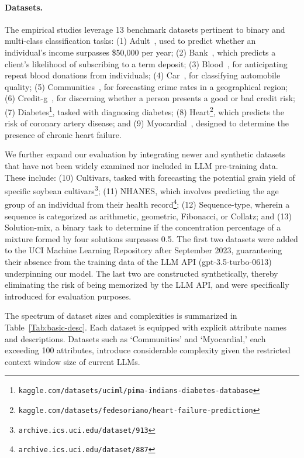 \paragraph{Datasets.}
The empirical studies leverage 13 benchmark datasets pertinent to binary and multi-class classification tasks: (1) Adult~\cite{asuncion2007uci}, used to predict whether an individual's income surpasses \$50,000 per year; (2) Bank~\cite{moro2014data}, which predicts a client’s likelihood of subscribing to a term deposit; (3) Blood~\cite{yeh2009knowledge}, for anticipating repeat blood donations from individuals; (4) Car~\cite{kadra2021well}, for classifying automobile quality; (5) Communities~\cite{misc_communities_and_crime_183}, for forecasting crime rates in a geographical region; (6) Credit-g~\cite{kadra2021well}, for discerning whether a person presents a good or bad credit risk; (7) Diabetes\footnote{\texttt{kaggle.com/datasets/uciml/pima-indians-diabetes-database}}, tasked with diagnosing diabetes; (8) Heart\footnote{\texttt{kaggle.com/datasets/fedesoriano/heart-failure-prediction}}, which predicts the risk of coronary artery disease; and (9) Myocardial~\cite{misc_myocardial_infarction_complications_579}, designed to determine the presence of chronic heart failure.

We further expand our evaluation by integrating newer and synthetic datasets that have not been widely examined nor included in LLM pre-training data. These include: (10) Cultivars, tasked with forecasting the potential grain yield of specific soybean cultivars\footnote{\texttt{archive.ics.uci.edu/dataset/913}}; (11) NHANES, which involves predicting the age group of an individual from their health record\footnote{\texttt{archive.ics.uci.edu/dataset/887}}; (12) Sequence-type, wherein a sequence is categorized as arithmetic, geometric, Fibonacci, or Collatz; and (13) Solution-mix, a binary task to determine if the concentration percentage of a mixture formed by four solutions surpasses 0.5. The first two datasets were added to the UCI Machine Learning Repository after September 2023, guaranteeing their absence from the training data of the LLM API (gpt-3.5-turbo-0613) underpinning our model. The last two are constructed synthetically, thereby eliminating the risk of being memorized by the LLM API, and were specifically introduced for evaluation purposes.

The spectrum of dataset sizes and complexities is summarized in Table~\ref{Tab:basic-desc}. Each dataset is equipped with explicit attribute names and descriptions. Datasets such as `Communities' and `Myocardial,' each exceeding 100 attributes, introduce considerable complexity given the restricted context window size of current LLMs.


